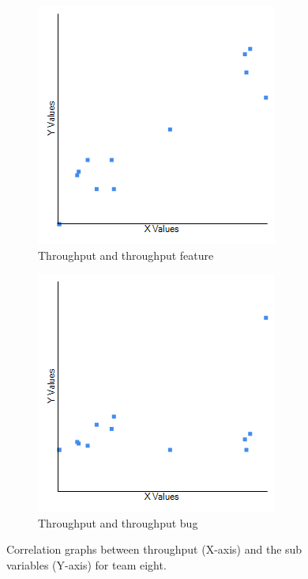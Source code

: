 \documentclass[UKenglish]{ifimaster}  %
\begin{document}
\begin{minipage}[t]{\linewidth}
\begin{figure}[H] 
  \begin{subfigure}[b]{0.5\textwidth}
  \center
\includegraphics[scale=0.6]{Picture/Eight/TPvsTPFT.png}
 \caption{Throughput and throughput feature} 
 \label{fig:a:8}
  \end{subfigure}
  \begin{subfigure}[b]{0.5\textwidth}
  \center
\includegraphics[scale=0.6]{Picture/Eight/TPvsTPB.png}
 \caption{Throughput and throughput bug} 
\label{fig:b:8}
  \end{subfigure}
  \caption{Correlation graphs between throughput (X-axis) and the sub variables (Y-axis) for team eight.}
\label{corr:Difference:8}
\end{figure}
\end{minipage}
\end{document}
